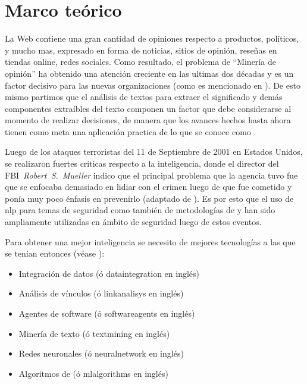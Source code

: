 \chapter{Marco teórico} %

\label{ch:MarcoTeorico} %



La Web contiene una gran cantidad de opiniones respecto a productos, políticos, y mucho mas, expresado en forma de noticias, sitios de opinión, reseñas en tiendas online, redes sociales. Como resultado, el problema de ``Minería de opinión'' ha obtenido una atención creciente en las ultimas dos décadas y es un factor decisivo para las nuevas organizaciones (como es mencionado en \cite{Popescu2007}). De esto mismo partimos que el análisis de textos para extraer el significado y demás componentes extraíbles del texto componen un factor que debe considerarse al momento de realizar decisiones, de manera que los avances hechos hasta ahora tienen como meta una aplicación practica de lo que se conoce como .

Luego de los ataques terroristas del 11 de Septiembre de 2001 en Estados Unidos, se realizaron fuertes criticas respecto a la inteligencia, donde el director del FBI~\emph{Robert~S.~Mueller} indico que el principal problema que la agencia tuvo fue que se enfocaba demasiado en lidiar con el crimen luego de que fue cometido y ponía muy poco énfasis en prevenirlo (adaptado de \cite{mena2003investigative}). Es por esto que el uso de \gls{nlp} para temas de seguridad como también de metodologías de  y  han sido ampliamente utilizadas en ámbito de seguridad luego de estos eventos.

Para obtener una mejor inteligencia se necesito de mejores tecnologías a las que se tenían entonces (véase \cite[p\'ag 2]{mena2003investigative}):
\begin{itemize}
\item Integración de datos (\'o \gls{dataintegration} en ingl\'es)
\item Análisis de vínculos (\'o \gls{linkanalisys} en ingl\'es)
\item Agentes de software (\'o \gls{softwareagents} en ingl\'es)
\item Minería de texto (\'o \gls{textmining} en ingl\'es)
\item Redes neuronales (\'o \gls{neuralnetwork} en ingl\'es)
\item Algoritmos de  (\'o \gls{mlalgorithms} en ingl\'es)
\end{itemize}

